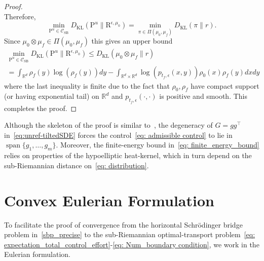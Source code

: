 \documentclass{amsart}
\numberwithin{equation}{section}
\newcommand{\R}{\mathbb{R}}
\newcommand{\KL}{D_{\mathrm{KL}}}
\begin{document}
\begin{proof}
\[\]
Therefore,
\[
\min_{\mathrm{P}^u \in \mathcal C_{\mathrm{SB}}} \KL(\mathrm{P}^u \| \mathrm{R}^{\epsilon,\mu_0})=\min_{\pi\in\Pi(\mu_0,\mu_f)} \KL(\pi \| r).
\]
Since $\mu_0\otimes\mu_f\in \Pi(\mu_0,\mu_f)$ this gives an upper bound
\begin{multline}\label{eq: finite_energy_bound}
\min_{\mathrm{P}^u \in \mathcal C_{\mathrm{SB}}} \KL(\mathrm{P}^u \| \mathrm{R}^{\epsilon,\mu_0})\leq \KL(\mu_0\otimes\mu_f \| r)\\=\int_{\R^d}\rho_f(y)\log(\rho_f(y))dy-\int_{\R^d\times\R^d}\log(p_{t_f,\epsilon}(x,y))\rho_0(x)\rho_f(y)dxdy
\end{multline}
where the last inequality is finite due to the fact that $\rho_0,\rho_f$ have compact support (or having exponential tail) on $\R^d$ and $p_{t_f,\epsilon}(\cdot,\cdot)$ is positive and smooth. This completes the proof.
\end{proof}
Although the skeleton of the proof is similar to~\cite{Leonard2014Survey}, the degeneracy of $G = gg^\top$ in~\eqref{eq:unref-tiltedSDE} forces the control~\eqref{eq: admissible control} to lie in $\operatorname{span}\{g_1,\dots,g_m\}$. Moreover, the finite-energy bound in~\eqref{eq: finite_energy_bound} relies on properties of the hypoelliptic heat-kernel, which in turn depend on the sub-Riemannian distance on~\eqref{eq: distribution}.


\section{Convex Eulerian Formulation}\label{sec:Eulerian}
To facilitate the proof of convergence from the horizontal Schr\"odinger bridge problem in~\eqref{sbp_precise} to the sub-Riemannian optimal-transport problem~\eqref{eq: expectation_total_control_effort}-\eqref{eq: Num_boundary condition}, we work in the Eulerian formulation.
\end{document}
